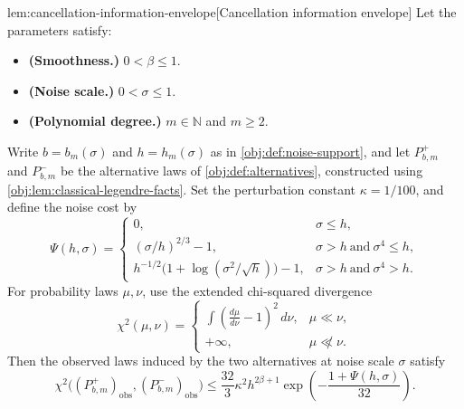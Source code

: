 \documentclass[11pt]{article}
\begin{document}
\begin{lemmav}{lem:cancellation-information-envelope}[Cancellation information envelope]
Let the parameters satisfy:
\begin{itemize}
\item \textbf{(Smoothness.)} \(0<\beta\le1\).
\item \textbf{(Noise scale.)} \(0<\sigma\le1\).
\item \textbf{(Polynomial degree.)} \(m\in\mathbb N\) and \(m\ge2\).
\end{itemize}
Write \(b=b_m(\sigma)\) and \(h=h_m(\sigma)\) as in
\cref{obj:def:noise-support}, and let \(P^+_{b,m}\) and \(P^-_{b,m}\)
be the alternative laws of \cref{obj:def:alternatives}, constructed using
\cref{obj:lem:classical-legendre-facts}. Set the perturbation constant
\(\kappa=1/100\), and define the noise cost by
\[
\Psi(h,\sigma)=
\begin{cases}
0, & \sigma\le h,\\
(\sigma/h)^{2/3}-1, & \sigma>h\ \text{and}\ \sigma^4\le h,\\
h^{-1/2}\bigl(1+\log(\sigma^2/\sqrt h)\bigr)-1,
& \sigma>h\ \text{and}\ \sigma^4>h.
\end{cases}
\]
For probability laws \(\mu,\nu\), use the extended chi-squared divergence
\[
\chi^2(\mu,\nu)=
\begin{cases}
\displaystyle\int\left(\frac{d\mu}{d\nu}-1\right)^2\,d\nu,
& \mu\ll\nu,\\
+\infty, & \mu\not\ll\nu.
\end{cases}
\]
Then the observed laws induced by the two alternatives at noise scale
\(\sigma\) satisfy
\[
\chi^2\bigl((P^+_{b,m})_{\mathrm{obs}},
           (P^-_{b,m})_{\mathrm{obs}}\bigr)
\le
\frac{32}{3}\kappa^2 h^{2\beta+1}
\exp\!\left(-\frac{1+\Psi(h,\sigma)}{32}\right).
\]
\end{lemmav}
\end{document}
